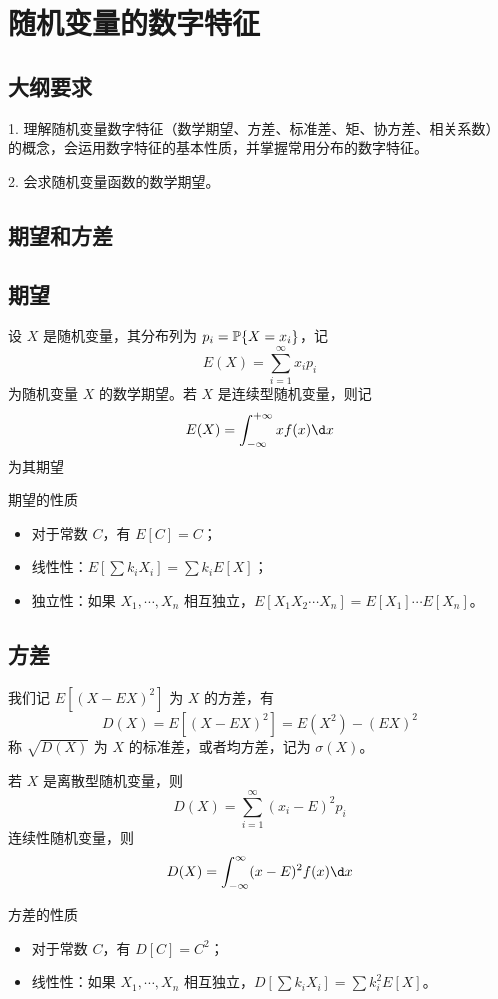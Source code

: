 \section{随机变量的数字特征}

\subsection{大纲要求}

1. 理解随机变量数字特征（数学期望、方差、标准差、矩、协方差、相关系数）的概念，会运用数字特征的基本性质，并掌握常用分布的数字特征。

2. 会求随机变量函数的数学期望。

\subsection{期望和方差}

\subsection*{期望}

设 $X$ 是随机变量，其分布列为 $p_i = \mathbb{P}\{X = x_i\}$，记
\[ E(X) = \sum_{i=1}^\infty x_i p_i \]
为随机变量 $X$ 的数学期望。若 $X$ 是连续型随机变量，则记
\[ E(X) = \int_{-\infty}^{+\infty} x f(x) \d x \]
为其期望

期望的性质
\begin{itemize}
	\item 对于常数 $C$，有 $E[C] = C$；
	\item 线性性：$E[\sum k_iX_i] = \sum k_i E[X]$；
	\item 独立性：如果 $X_1, \cdots, X_n$ 相互独立，$E[X_1X_2\cdots X_n] = E[X_1] \cdots E[X_n]$。
\end{itemize}

\subsection*{方差}

我们记 $E[(X - EX)^2]$ 为 $X$ 的方差，有
\[ D(X) = E[(X - EX)^2] = E(X^2) - (EX)^2 \]
称 $\sqrt{D(X)}$ 为 $X$ 的标准差，或者均方差，记为 $\sigma(X)$。

若 $X$ 是离散型随机变量，则
\[ D(X) = \sum_{i=1}^{\infty} (x_i - E)^2 p_i \]
连续性随机变量，则
\[ D(X) = \int_{-\infty}^{\infty} (x-E)^2 f(x) \d x \]

方差的性质
\begin{itemize}
	\item 对于常数 $C$，有 $D[C] = C^2$；
	\item 线性性：如果 $X_1, \cdots, X_n$ 相互独立，$D[\sum k_iX_i] = \sum k_i^2 E[X]$。
\end{itemize}

